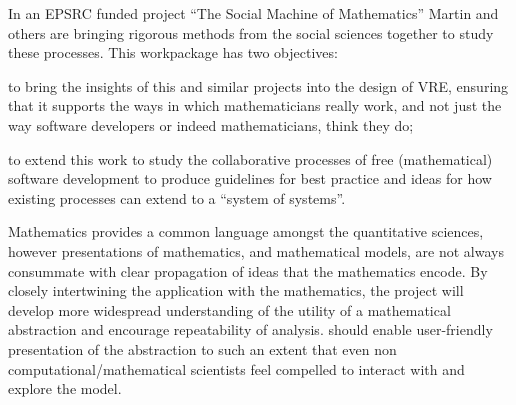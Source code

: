 \begin{workpackage}[id=social-aspects,wphases=0-48,
  title=Social Aspects,
  lead=UO,
  UORM=53,USHRM=8, USORM=5]
\begin{wpobjectives}
In an EPSRC funded project ``The Social Machine of Mathematics''
Martin and others are bringing rigorous methods from the social 
sciences together to study these processes. This workpackage has two
objectives: \begin{compactitem}
\item to bring the insights of this and similar projects into the
  design of \TheProject VRE, ensuring that it supports the ways in
  which mathematicians really work, and not just the way software
  developers or indeed mathematicians, think they do;
\item to extend this work to study the collaborative processes of free
  (mathematical) software development to produce guidelines for best
  practice and ideas for how existing processes can extend to a
  ``system of systems''.
\item {}
\end{compactitem} 







Mathematics provides a common language amongst the quantitative
sciences, however presentations of mathematics, and mathematical
models, are not always consummate with clear propagation of ideas that
the mathematics encode. By closely intertwining the application with
the mathematics, the project will develop more widespread
understanding of the utility of a mathematical abstraction and
encourage repeatability of analysis. \TheProject should enable
user-friendly presentation of the abstraction to such an extent that
even non computational/mathematical scientists feel compelled to
interact with and explore the model.




\end{wpobjectives}
\end{workpackage}
